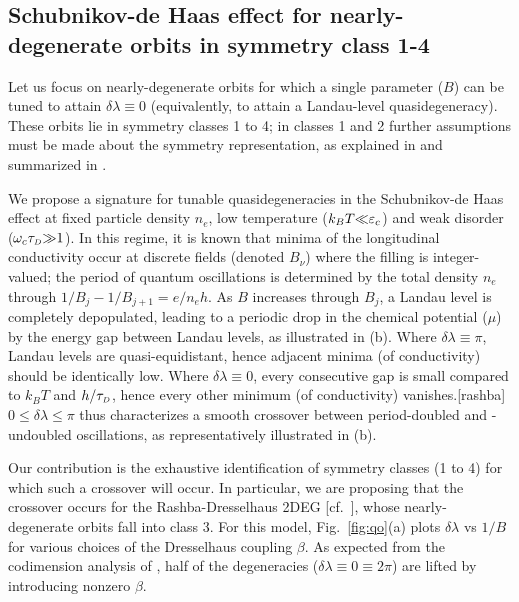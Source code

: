 \documentclass[aps, prb, showpacs, twocolumn, notitlepage, superscriptaddress]{revtex4-1}
\begin{document}

\subsection{Schubnikov-de Haas effect for nearly-degenerate orbits in symmetry class 1-4}\label{sec:quantosc_quasideg}

Let us focus on nearly-degenerate orbits for which a single parameter ($B$) can be tuned to attain $\delta \lambda{\equiv}0$ (equivalently, to attain a Landau-level quasidegeneracy). These orbits lie in symmetry classes 1 to 4; in classes 1 and 2 further assumptions must be made about the symmetry representation, as explained in  and summarized in .

We propose a signature for tunable quasidegeneracies in the  Schubnikov-de Haas effect at fixed particle density $n_e$, low temperature ($k_BT{\ll}\varepsilon_c$) and weak disorder ($\omega_c\tau_{\scriptscriptstyle{D}}{\gg}1$).
In this regime, it is known that minima of the longitudinal conductivity occur at discrete fields (denoted $B_{\nu}$)  where the filling is integer-valued\cite{vinter_resolution_1980}; the period of quantum oscillations is determined by the total density $n_e$ through $1/B_j{-}1/B_{j+1}{=}e/n_eh$. As $B$ increases through $B_j$, a Landau level is completely depopulated, leading to a periodic drop in the chemical potential ($\mu$) by the energy gap  between Landau levels, as illustrated in (b). Where $\delta\lambda{\equiv}\pi$, Landau levels are  quasi-equidistant, hence adjacent minima (of conductivity) should be identically low. Where $\delta\lambda{\equiv}0$, every consecutive gap is small compared to $k_BT$ and $h/\tau_{\scriptscriptstyle{D}}$, hence every other  minimum (of conductivity) vanishes.[rashba] $0{\leq}\delta\lambda{\leq}{\pi}$ thus characterizes a smooth crossover between period-doubled and -undoubled oscillations, as representatively illustrated in (b).


Our contribution is the exhaustive  identification of symmetry classes (1 to 4) for which such a crossover will occur. In particular, we are proposing that the crossover occurs for the Rashba-Dresselhaus 2DEG [cf.\ ], whose nearly-degenerate orbits fall into class 3. For this model,  Fig.\ \ref{fig:qo}(a) plots $\delta \lambda$ vs $1/B$ for various choices of the Dresselhaus coupling $\beta$. As expected from the codimension analysis of , half of the degeneracies ($\delta\lambda {\equiv}0{\equiv}2\pi$) are lifted by introducing nonzero $\beta$. 
\end{document}
